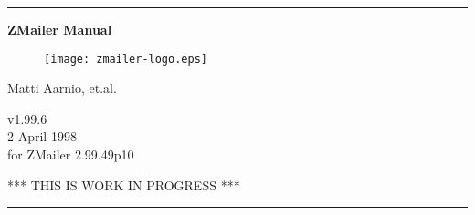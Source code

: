 \documentclass[twoside,a4paper]{article}
\begin{document}
\startdocument

\begin{titlepage}
{
\hrule
\begin{center}
\bfseries
\Huge
\vspace{2ex}
ZMailer Manual \\
\vspace{2ex}

\begin{htmlonly}
\end{htmlonly}

\begin{figure}[h]
  \texttt{[image: zmailer-logo.eps]}
\end{figure}
\vspace{2ex}

\Large
Matti Aarnio, et.al. \\
\vspace{2ex}
\begin{htmlonly}
\vspace{1ex}
\end{htmlonly}
v1.99.6 \\
2 April 1998 \\
for ZMailer 2.99.49p10 \\
\vspace{2ex}
\begin{htmlonly}
\vspace{1ex}
\end{htmlonly}
\Huge
\sffamily
*** THIS IS WORK IN PROGRESS ***
\end{center}
\vfill
\hrule
}
\end{titlepage}

\cleardoublepage
\end{document}
